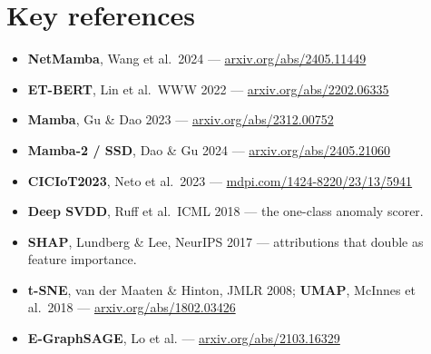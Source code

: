 \documentclass[11pt,a4paper]{article}
\begin{document}
\section*{Key references}
\footnotesize
\begin{itemize}[leftmargin=*, itemsep=1pt]
  \item \textbf{NetMamba}, Wang et al.\ 2024 --- \href{https://arxiv.org/abs/2405.11449}{arxiv.org/abs/2405.11449}
  \item \textbf{ET-BERT}, Lin et al.\ WWW 2022 --- \href{https://arxiv.org/abs/2202.06335}{arxiv.org/abs/2202.06335}
  \item \textbf{Mamba}, Gu \& Dao 2023 --- \href{https://arxiv.org/abs/2312.00752}{arxiv.org/abs/2312.00752}
  \item \textbf{Mamba-2 / SSD}, Dao \& Gu 2024 --- \href{https://arxiv.org/abs/2405.21060}{arxiv.org/abs/2405.21060}
  \item \textbf{CICIoT2023}, Neto et al.\ 2023 --- \href{https://www.mdpi.com/1424-8220/23/13/5941}{mdpi.com/1424-8220/23/13/5941}
  \item \textbf{Deep SVDD}, Ruff et al.\ ICML 2018 --- the one-class anomaly scorer.
  \item \textbf{SHAP}, Lundberg \& Lee, NeurIPS 2017 --- attributions that double as feature importance.
  \item \textbf{t-SNE}, van der Maaten \& Hinton, JMLR 2008; \textbf{UMAP}, McInnes et al.\ 2018 --- \href{https://arxiv.org/abs/1802.03426}{arxiv.org/abs/1802.03426}
  \item \textbf{E-GraphSAGE}, Lo et al. --- \href{https://arxiv.org/abs/2103.16329}{arxiv.org/abs/2103.16329}
\end{itemize}
\end{document}
